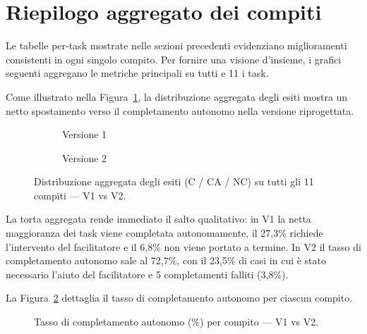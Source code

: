 \section{Riepilogo aggregato dei compiti}

Le tabelle per-task mostrate nelle sezioni precedenti evidenziano miglioramenti consistenti in ogni singolo compito. Per fornire una visione d'insieme, i grafici seguenti aggregano le metriche principali su tutti e 11 i task.

Come illustrato nella Figura~\ref{fig:torta_esiti}, la distribuzione aggregata degli esiti mostra un netto spostamento verso il completamento autonomo nella versione riprogettata.

\begin{figure}[H]
    \vspace{0.8em}
    \centering
    \begin{subfigure}{0.45\textwidth}
        \centering
        \caption{Versione 1}
    \end{subfigure}%
    \hfill
    \begin{subfigure}{0.45\textwidth}
        \centering
        \caption{Versione 2}
    \end{subfigure}
    \vspace{0.5em}
    \caption{Distribuzione aggregata degli esiti (C / CA / NC) su tutti gli 11 compiti — V1 vs V2.}
    \label{fig:torta_esiti}
    \vspace{0.8em}
\end{figure}

La torta aggregata rende immediato il salto qualitativo: in V1 la netta maggioranza dei task viene completata autonomamente, il 27,3\% richiede l'intervento del facilitatore e il 6,8\% non viene portato a termine. In V2 il tasso di completamento autonomo sale al 72,7\%, con il 23,5\% di casi in cui è stato necessario l'aiuto del facilitatore e 5 completamenti falliti (3,8\%).

La Figura~\ref{fig:completamento} dettaglia il tasso di completamento autonomo per ciascun compito.

\begin{figure}[H]
    \centering
    
    \caption{Tasso di completamento autonomo (\%) per compito — V1 vs V2.}
    \label{fig:completamento}
\end{figure}

